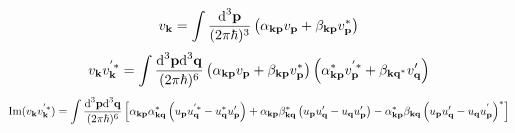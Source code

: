 \begin{equation}
	v_\mathbf{k}=\int\frac{\text{d}^3\mathbf{p}}{(2\pi\hbar)^3}\left(\alpha_{\mathbf{kp}}v_\mathbf{p}+\beta_{\mathbf{kp}}v_\mathbf{p}^*\right)
\end{equation}
\begin{equation}
	v_\mathbf{k}v_\mathbf{k}^{'*}=\int\frac{\text{d}^3\mathbf{p}\text{d}^3\mathbf{q}}{(2\pi\hbar)^6}\left(\alpha_{\mathbf{kp}}v_\mathbf{p}+\beta_{\mathbf{kp}}v_\mathbf{p}^*\right)\left(\alpha_{\mathbf{kp}}^*v_\mathbf{p}^{'*}+\beta_{\mathbf{kq}^*}v_\mathbf{q}'\right)
\end{equation}
\begin{multline}
	\text{Im}(v_\mathbf{k}v_{\mathbf{k}}^{'*})=\int\frac{\text{d}^3\mathbf{p}\text{d}^3\mathbf{q}}{(2\pi\hbar)^6}\left[\alpha_{\mathbf{kp}}\alpha_{\mathbf{kq}}^*\left(u_\mathbf{p}u_\mathbf{q}^{'*}-u_\mathbf{q}^*u_\mathbf{p}'\right)+\alpha_{\mathbf{kp}}\beta_{\mathbf{kq}}^*\left(u_\mathbf{p}u_\mathbf{q}'-u_\mathbf{q}u_\mathbf{p}'\right)-\alpha_{\mathbf{kp}}^*\beta_{\mathbf{kq}}\left(u_\mathbf{p}u_\mathbf{q}'-u_\mathbf{q}u_\mathbf{p}^{'}\right)^*\right]
\end{multline}